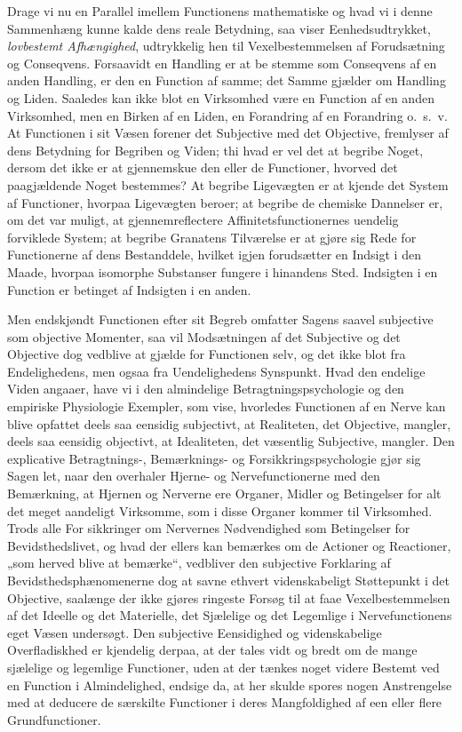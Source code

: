 \documentclass[12pt]{book}
\newcommand{\opage}[1]{\marginnote{\footnotesize\textit{[#1]}}}
\begin{document}
Drage vi nu en Parallel imellem Functionens mathematiske og hvad vi i denne Sammenhæng kunne kalde
dens reale Betydning, saa viser Eenhedsudtrykket, \emph{lovbestemt Afhængighed}, udtrykkelig hen til
Vexelbestemmelsen af Forudsætning og Conseqvens. Forsaavidt en Handling er at be%
\opage{279} stemme som Conseqvens af en anden Handling, er den en Function af samme; det Samme gjælder om Handling
og Liden. Saaledes kan ikke blot en Virksomhed være en Function af en anden Virksomhed, men en Birken
af en Liden, en Forandring af en Forandring o.\ s.\ v. At Functionen i sit Væsen forener det Subjective
med det Objective, fremlyser af dens Betydning for Begriben og Viden; thi hvad er vel det at begribe
Noget, dersom det ikke er at gjennemskue den eller de Functioner, hvorved det paagjældende Noget
bestemmes? At begribe Ligevægten er at kjende det System af Functioner, hvorpaa Ligevægten beroer; at
begribe de chemiske Dannelser er, om det var muligt, at gjennemreflectere Affinitetsfunctionernes
uendelig forviklede System; at begribe Granatens Tilværelse er at gjøre sig Rede for Functionerne af
dens Bestanddele, hvilket igjen forudsætter en Indsigt i den Maade, hvorpaa isomorphe Substanser
fungere i hinandens Sted. Indsigten i en Function er betinget af Indsigten i en anden.

Men endskjøndt Functionen efter sit Begreb omfatter Sagens saavel subjective som objective Momenter,
saa vil Modsætningen af det Subjective og det Objective dog vedblive at gjælde for Functionen selv, og
det ikke blot fra Endelighedens, men ogsaa fra Uendelighedens Synspunkt. Hvad den endelige Viden
angaaer, have vi i den almindelige Betragtningspsychologie og den empiriske Physiologie Exempler, som
vise, hvorledes Functionen af en Nerve kan blive opfattet deels saa eensidig subjectivt, at Realiteten,
det Objective, mangler, deels saa eensidig objectivt, at Idealiteten, det væsentlig Subjective, mangler.
Den explicative Betragtnings-, Bemærknings- og Forsikkringspsychologie gjør sig Sagen let, naar den
overhaler Hjerne- og Nervefunctionerne med den Bemærkning, at Hjernen og Nerverne ere Organer, Midler
og Betingelser for alt det meget aandeligt Virksomme, som i disse Organer kommer til Virksomhed. Trods
alle For%
\opage{280} sikkringer om Nervernes Nødvendighed som Betingelser for Bevidsthedslivet, og hvad der ellers kan
bemærkes om de Actioner og Reactioner, „som herved blive at bemærke“, vedbliver den subjective
Forklaring af Bevidsthedsphænomenerne dog at savne ethvert videnskabeligt Støttepunkt i det Objective,
saalænge der ikke gjøres ringeste Forsøg til at faae Vexelbestemmelsen af det Ideelle og det
Materielle, det Sjælelige og det Legemlige i Nervefunctionens eget Væsen undersøgt. Den subjective
Eensidighed og videnskabelige Overfladiskhed er kjendelig derpaa, at der tales vidt og bredt om de
mange sjælelige og legemlige Functioner, uden at der tænkes noget videre Bestemt ved en Function i
Almindelighed, endsige da, at her skulde spores nogen Anstrengelse med at deducere de særskilte
Functioner i deres Mangfoldighed af een eller flere Grundfunctioner.
\end{document}
